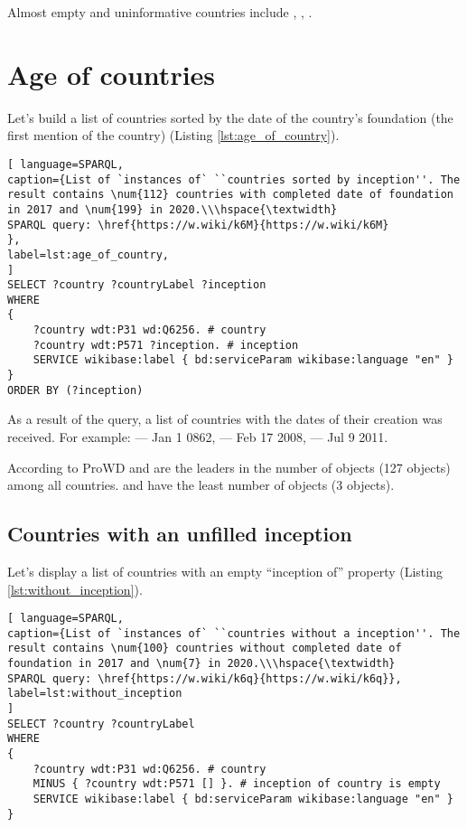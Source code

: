 Almost empty and uninformative countries include , , .


\section{Age of countries}

Let's build a list of countries sorted by the date of the country's foundation (the first mention of the country) (Listing \ref{lst:age_of_country}).

\begin{lstlisting}[ language=SPARQL, 
caption={List of `instances of` ``countries sorted by inception''. The result contains \num{112} countries with completed date of foundation in 2017 and \num{199} in 2020.\\\hspace{\textwidth}
SPARQL query: \href{https://w.wiki/k6M}{https://w.wiki/k6M}
},
label=lst:age_of_country, 					
]
SELECT ?country ?countryLabel ?inception
WHERE
{
	?country wdt:P31 wd:Q6256. # country
	?country wdt:P571 ?inception. # inception
	SERVICE wikibase:label { bd:serviceParam wikibase:language "en" }
}
ORDER BY (?inception)
\end{lstlisting}


As a result of the query, a list of countries with the dates of their creation was received. For example:  --- Jan 1 0862,  --- Feb 17 2008,  --- Jul 9 2011.

According to ProWD  and  are the leaders in the number of objects (127 objects) among all countries.  and  have the least number of objects (3 objects).


\subsection{Countries with an unfilled inception}

Let's display a list of countries with an empty ``inception of'' property (Listing \ref{lst:without_inception}).

\begin{lstlisting}[ language=SPARQL, 
caption={List of `instances of` ``countries without a inception''. The result contains \num{100} countries without completed date of foundation in 2017 and \num{7} in 2020.\\\hspace{\textwidth}
SPARQL query: \href{https://w.wiki/k6q}{https://w.wiki/k6q}},
label=lst:without_inception
]
SELECT ?country ?countryLabel 
WHERE
{
	?country wdt:P31 wd:Q6256. # country
	MINUS { ?country wdt:P571 [] }. # inception of country is empty
	SERVICE wikibase:label { bd:serviceParam wikibase:language "en" }
}
\end{lstlisting}

